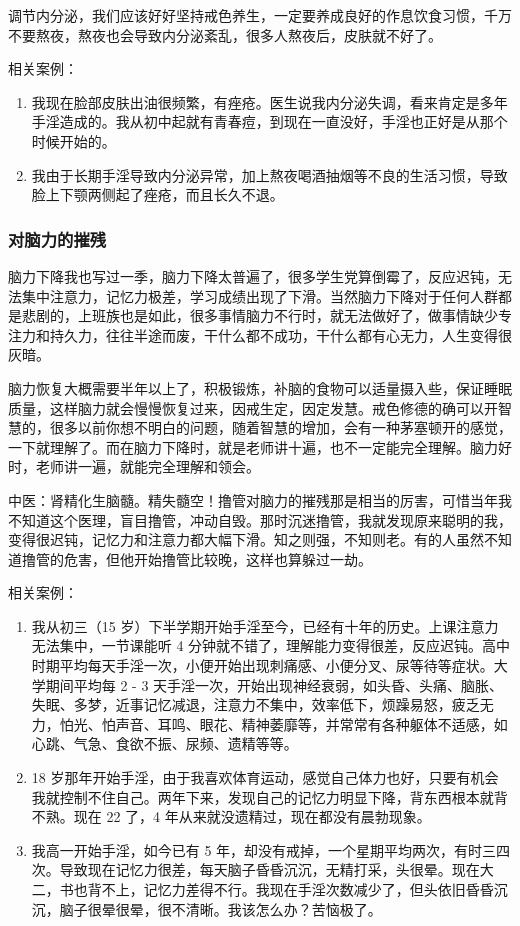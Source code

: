 \documentclass{ctexart}
\begin{document}
调节内分泌，我们应该好好坚持戒色养生，一定要养成良好的作息饮食习惯，千万不要熬夜，熬夜也会导致内分泌紊乱，很多人熬夜后，皮肤就不好了。

相关案例：

\begin{enumerate}
    \item 我现在脸部皮肤出油很频繁，有痤疮。医生说我内分泌失调，看来肯定是多年手淫造成的。我从初中起就有青春痘，到现在一直没好，手淫也正好是从那个时候开始的。
    \item 我由于长期手淫导致内分泌异常，加上熬夜喝酒抽烟等不良的生活习惯，导致脸上下颚两侧起了痤疮，而且长久不退。
\end{enumerate}

\subsubsection{对脑力的摧残}

脑力下降我也写过一季，脑力下降太普遍了，很多学生党算倒霉了，反应迟钝，无法集中注意力，记忆力极差，学习成绩出现了下滑。当然脑力下降对于任何人群都是悲剧的，上班族也是如此，很多事情脑力不行时，就无法做好了，做事情缺少专注力和持久力，往往半途而废，干什么都不成功，干什么都有心无力，人生变得很灰暗。

脑力恢复大概需要半年以上了，积极锻炼，补脑的食物可以适量摄入些，保证睡眠质量，这样脑力就会慢慢恢复过来，因戒生定，因定发慧。戒色修德的确可以开智慧的，很多以前你想不明白的问题，随着智慧的增加，会有一种茅塞顿开的感觉，一下就理解了。而在脑力下降时，就是老师讲十遍，也不一定能完全理解。脑力好时，老师讲一遍，就能完全理解和领会。

中医：肾精化生脑髓。精失髓空！撸管对脑力的摧残那是相当的厉害，可惜当年我不知道这个医理，盲目撸管，冲动自毁。那时沉迷撸管，我就发现原来聪明的我，变得很迟钝，记忆力和注意力都大幅下滑。知之则强，不知则老。有的人虽然不知道撸管的危害，但他开始撸管比较晚，这样也算躲过一劫。

相关案例：

\begin{enumerate}
    \item 我从初三（15 岁）下半学期开始手淫至今，已经有十年的历史。上课注意力无法集中，一节课能听 4 分钟就不错了，理解能力变得很差，反应迟钝。高中时期平均每天手淫一次，小便开始出现刺痛感、小便分叉、尿等待等症状。大学期间平均每 2 - 3 天手淫一次，开始出现神经衰弱，如头昏、头痛、脑胀、失眠、多梦，近事记忆减退，注意力不集中，效率低下，烦躁易怒，疲乏无力，怕光、怕声音、耳鸣、眼花、精神萎靡等，并常常有各种躯体不适感，如心跳、气急、食欲不振、尿频、遗精等等。
    \item 18 岁那年开始手淫，由于我喜欢体育运动，感觉自己体力也好，只要有机会我就控制不住自己。两年下来，发现自己的记忆力明显下降，背东西根本就背不熟。现在 22 了，4 年从来就没遗精过，现在都没有晨勃现象。
    \item 我高一开始手淫，如今已有 5 年，却没有戒掉，一个星期平均两次，有时三四次。导致现在记忆力很差，每天脑子昏昏沉沉，无精打采，头很晕。现在大二，书也背不上，记忆力差得不行。我现在手淫次数减少了，但头依旧昏昏沉沉，脑子很晕很晕，很不清晰。我该怎么办？苦恼极了。
\end{enumerate}
\end{document}

